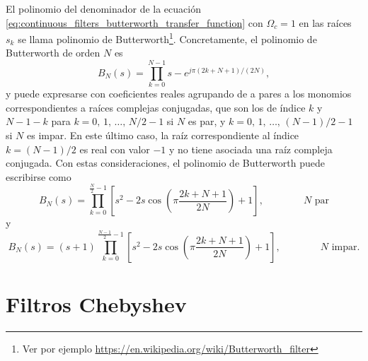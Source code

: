 \documentclass[a4paper]{report}
\begin{document}
El polinomio del denominador de la ecuación \ref{eq:continuous_filters_butterworth_transfer_function} con \(\Omega_c=1\) en las raíces \(s_k\) se llama polinomio de Butterworth\footnote{Ver por ejemplo \url{https://en.wikipedia.org/wiki/Butterworth_filter}}. Concretamente, el polinomio de Butterworth de orden \(N\) es
\[
 B_N(s)=\prod_{k=0}^{N-1}s-e^{j\pi\left(2k+N+1\right)/(2N)},
\]
y puede expresarse con coeficientes reales agrupando de a pares a los monomios correspondientes a raíces complejas conjugadas, que son los de índice \(k\) y \(N-1-k\) para \(k=0,\,1,\,\dots,\,N/2-1\) si \(N\) es par, y \(k=0,\,1,\,\dots,\,(N-1)/2-1\) si \(N\) es impar. En este último caso, la raíz correspondiente al índice \(k=(N-1)/2\) es real con valor \(-1\) y no tiene asociada una raíz compleja conjugada. Con estas consideraciones, el polinomio de Butterworth puede escribirse como
\[
 B_N(s)=\prod_{k=0}^{\frac{N}{2}-1}\left[s^2-2s\cos\left(\pi\frac{2k+N+1}{2N}\right)+1\right],
 \qquad\qquad 
 N\textrm{ par}
\]
y
\[
 B_N(s)=(s+1)\prod_{k=0}^{\frac{N-1}{2}-1}\left[s^2-2s\cos\left(\pi\frac{2k+N+1}{2N}\right)+1\right],
 \qquad\qquad 
 N\textrm{ impar.}
\]

\section{Filtros Chebyshev}
\end{document}
